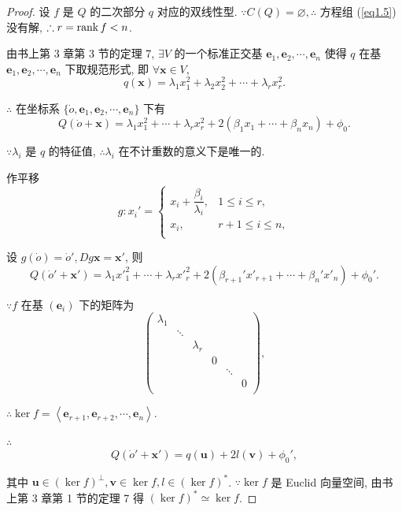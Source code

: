 \documentclass{ctexart}
\begin{document}
\begin{proof}
    设 $f$ 是 $Q$ 的二次部分 $q$ 对应的双线性型. $\because C(Q)=\varnothing,\therefore$ 方程组 (\ref{eq1.5}) 没有解, $\therefore r=\operatorname{rank} f<n$.

    由书上第 3 章第 3 节的定理 7, $\exists V$ 的一个标准正交基 $\boldsymbol{e}_1,\boldsymbol{e}_2,\cdots,\boldsymbol{e}_n$ 使得 $q$ 在基 $\boldsymbol{e}_1,\boldsymbol{e}_2,\cdots,\boldsymbol{e}_n$ 下取规范形式, 即 $\forall\boldsymbol{x}\in V$,
    \[q(\boldsymbol{x})=\lambda_1x^2_1+\lambda_2x^2_2+\cdots+\lambda_rx^2_r.\]

    $\therefore$ 在坐标系 $\{\dot{o},\boldsymbol{e}_1,\boldsymbol{e}_2,\cdots,\boldsymbol{e}_n\}$ 下有
    \[Q(\dot{o}+\boldsymbol{x})=\lambda_1x^2_1+\cdots+\lambda_rx^2_r+2(\beta_1x_1+\cdots+\beta_nx_n)+\phi_0.\]

    $\because\lambda_i$ 是 $q$ 的特征值, $\therefore\lambda_i$ 在不计重数的意义下是唯一的.

    作平移
    \[g:x_i'=\begin{cases}
        x_i+\dfrac{\beta_i}{\lambda_i}, & 1\leq i\leq r, \\
        x_i, & r+1\leq i\leq n, \\
    \end{cases}\]

    设 $g(\dot{o})=\dot{o}',Dg\boldsymbol{x}=\boldsymbol{x}'$, 则
    \[Q(\dot{o}'+\boldsymbol{x}')=\lambda_1x'^2_1+\cdots+\lambda_rx'^2_r+2(\beta_{r+1}'x'_{r+1}+\cdots+\beta_n'x'_n)+\phi_0'.\]

    $\because f$ 在基 $(\boldsymbol{e}_i)$ 下的矩阵为
    \[\begin{pmatrix}
        \lambda_1 \\
        & \ddots \\
        && \lambda_r \\
        &&& 0 \\
        &&&& \ddots \\
        &&&&& 0 \\
    \end{pmatrix},\]

    $\therefore\ker f=\left<\boldsymbol{e}_{r+1},\boldsymbol{e}_{r+2},\cdots,\boldsymbol{e}_n\right>$.

    $\therefore$
    \[Q(\dot{o}'+\boldsymbol{x}')=q(\boldsymbol{u})+2l(\boldsymbol{v})+\phi_0',\]

    其中 $\boldsymbol{u}\in(\ker f)^\perp,\boldsymbol{v}\in\ker f,l\in(\ker f)^*$. $\because\ker f$ 是 Euclid 向量空间, 由书上第 3 章第 1 节的定理 7 得 $(\ker f)^*\simeq\ker f$.
    

\end{proof}
\end{document}
